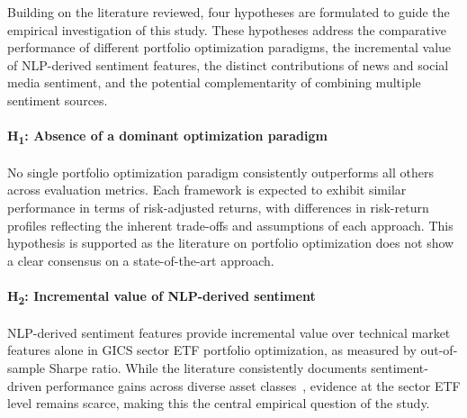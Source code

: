 Building on the literature reviewed, four hypotheses are formulated to guide the empirical investigation of this study. These hypotheses address the comparative performance of different portfolio optimization paradigms, the incremental value of NLP-derived sentiment features, the distinct contributions of news and social media sentiment, and the potential complementarity of combining multiple sentiment sources.

\paragraph{H\textsubscript{1}: Absence of a dominant optimization paradigm} No single portfolio optimization paradigm consistently outperforms all others across evaluation metrics. Each framework is expected to exhibit similar performance in terms of risk-adjusted returns, with differences in risk-return profiles reflecting the inherent trade-offs and assumptions of each approach. This hypothesis is supported as the literature on portfolio optimization does not show a clear consensus on a state-of-the-art approach.

\paragraph{H\textsubscript{2}: Incremental value of NLP-derived sentiment} NLP-derived sentiment features provide incremental value over technical market features alone in GICS sector ETF portfolio optimization, as measured by out-of-sample Sharpe ratio. While the literature consistently documents sentiment-driven performance gains across diverse asset classes~\cite{e6ca3, de270, 0f204}, evidence at the sector ETF level remains scarce, making this the central empirical question of the study.

